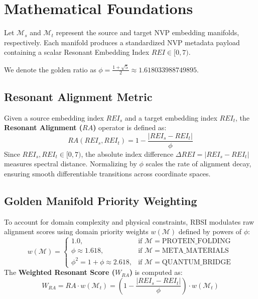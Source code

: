 \section{Mathematical Foundations}
Let $\mathcal{M}_s$ and $\mathcal{M}_t$ represent the source and target NVP embedding manifolds, respectively. Each manifold produces a standardized NVP metadata payload containing a scalar Resonant Embedding Index $REI \in [0, 7)$.

We denote the golden ratio as $\phi = \frac{1 + \sqrt{5}}{2} \approx 1.618033988749895$.

\subsection{Resonant Alignment Metric}
Given a source embedding index $REI_s$ and a target embedding index $REI_t$, the \textbf{Resonant Alignment ($RA$)} operator is defined as:
\begin{equation}
    RA(REI_s, REI_t) = 1 - \frac{|REI_s - REI_t|}{\phi}
\end{equation}
Since $REI_s, REI_t \in [0, 7)$, the absolute index difference $\Delta REI = |REI_s - REI_t|$ measures spectral distance. Normalizing by $\phi$ scales the rate of alignment decay, ensuring smooth differentiable transitions across coordinate spaces.

\subsection{Golden Manifold Priority Weighting}
To account for domain complexity and physical constraints, RBSI modulates raw alignment scores using domain priority weights $w(\mathcal{M})$ defined by powers of $\phi$:
\begin{equation}
    w(\mathcal{M}) = \begin{cases}
        1.0, & \text{if } \mathcal{M} = \text{PROTEIN\_FOLDING} \\
        \phi \approx 1.618, & \text{if } \mathcal{M} = \text{META\_MATERIALS} \\
        \phi^2 = 1 + \phi \approx 2.618, & \text{if } \mathcal{M} = \text{QUANTUM\_BRIDGE}
    \end{cases}
\end{equation}
The \textbf{Weighted Resonant Score ($W_{RA}$)} is computed as:
\begin{equation}
    W_{RA} = RA \cdot w(\mathcal{M}_t) = \left(1 - \frac{|REI_s - REI_t|}{\phi}\right) \cdot w(\mathcal{M}_t)
\end{equation}

